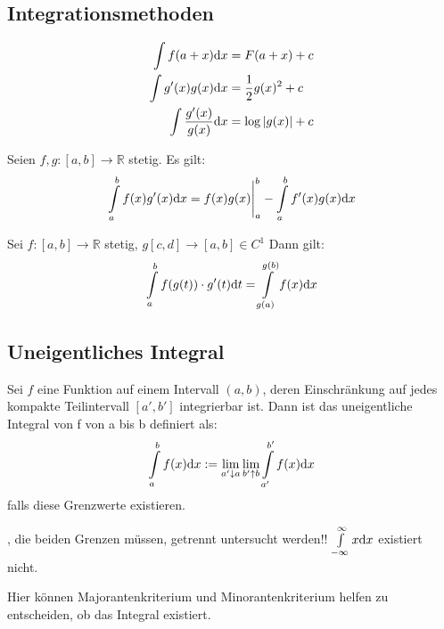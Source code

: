	\subsection{Integrationsmethoden}
		\begin{proofhelp}
			\begin{align*}
				\int f(a + x) \mathrm{d} x &= F(a+x) + c \\
				\int g^\prime(x)g(x) \mathrm{d} x &= \frac{1}{2}g(x)^2 + c \\
				\int \frac{g^\prime(x)}{g(x)} \mathrm{d} x &= \log \left\vert g(x) \right\vert + c
			\end{align*}
		\end{proofhelp}
		\begin{proofhelp}
			Seien $f,g:[a,b] \to \mathbb{R}$ stetig. Es gilt:
			$$ \int\limits_{a}^{b} f(x)g^\prime(x) \mathrm{d} x = f(x)g(x) \Bigg\vert_{a}^{b} - \int\limits_a^b f^\prime(x)g(x) \mathrm{d} x $$
		\end{proofhelp}
		\begin{proofhelp}[Substitution]
			Sei $f:[a,b] \to \mathbb{R}$ stetig, $g[c,d] \to [a,b] \in C^1$ Dann gilt:
			$$ \int\limits_{a}^{b} f(g(t)) \cdot g^\prime(t) \mathrm{d} t = \int\limits_{g(a)}^{g(b)}f(x) \mathrm{d} x $$
		\end{proofhelp}
	\subsection{Uneigentliches Integral}
		\begin{definition}
			Sei $f$ eine Funktion auf einem Intervall $(a,b)$, deren Einschränkung auf jedes kompakte Teilintervall $[a',b']$ integrierbar ist. Dann ist das uneigentliche Integral von f von a bis b definiert als:
			$$\int\limits_{a}^{b} f(x) \mathrm{d} x := \lim\limits_{a' \downarrow a} \lim\limits_{b' \uparrow b} \int\limits_{a'}^{b'}f(x) \mathrm{d} x$$
			falls diese Grenzwerte existieren.
		\end{definition}
		\begin{proofhelp}
			, die beiden Grenzen müssen, getrennt untersucht werden!! $\int\limits_{-\infty}^{\infty} x \mathrm{d} x$ existiert nicht.
		\end{proofhelp}
		\begin{hint}
			Hier können Majorantenkriterium und Minorantenkriterium helfen zu entscheiden, ob das Integral existiert.
		\end{hint}